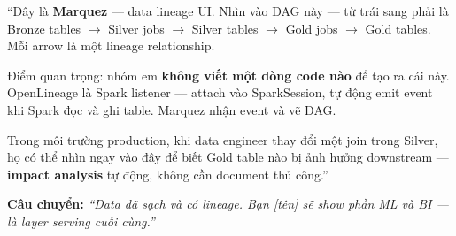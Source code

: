 \documentclass[12pt, a4paper]{article}
\newenvironment{speakerbox}[2]{%
  \begin{tcolorbox}[
    enhanced, breakable,
    colback=#1!6!white,
    colframe=#1,
    colbacktitle=#1,
    coltitle=white,
    fonttitle=\bfseries\large,
    title={#2},
    arc=4pt,
    boxrule=1.5pt,
    left=8pt, right=8pt, top=6pt, bottom=6pt,
  ]
}{%
  \end{tcolorbox}
}
\begin{document}
\begin{speakerbox}{p3color}{\faUser\ Người 3 · 6:00 -- 9:00}
\begin{scriptbox}
``Đây là \textbf{Marquez} --- data lineage UI. Nhìn vào DAG này --- từ trái sang phải là
Bronze tables $\to$ Silver jobs $\to$ Silver tables $\to$ Gold jobs $\to$ Gold tables.
Mỗi arrow là một lineage relationship.

Điểm quan trọng: nhóm em \textbf{không viết một dòng code nào} để tạo ra cái này.
OpenLineage là Spark listener --- attach vào SparkSession, tự động emit event khi
Spark đọc và ghi table. Marquez nhận event và vẽ DAG.

Trong môi trường production, khi data engineer thay đổi một join trong Silver,
họ có thể nhìn ngay vào đây để biết Gold table nào bị ảnh hưởng downstream ---
\textbf{impact analysis} tự động, không cần document thủ công.''
\end{scriptbox}

\textbf{Câu chuyển:} \textit{``Data đã sạch và có lineage. Bạn [tên] sẽ show phần ML
và BI --- là layer serving cuối cùng.''}

\end{speakerbox}

\vspace{1em}
\end{document}
